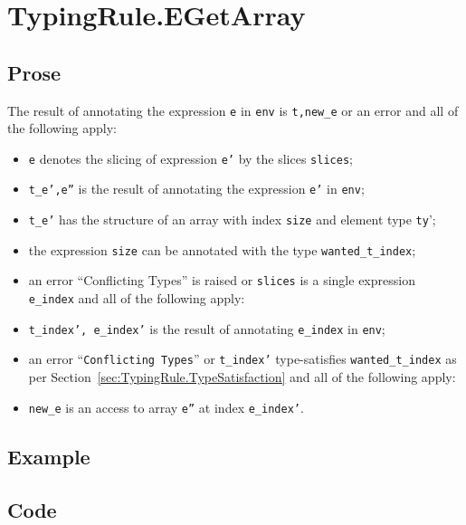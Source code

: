 \documentclass{book}
\begin{document}
\section{TypingRule.EGetArray \label{sec:TypingRule.EGetArray}}

  \subsection{Prose}
  The result of annotating the expression \texttt{e} in \texttt{env} is
\texttt{t,new\_e} or an error and all of the following apply:
  \begin{itemize}
  \item \texttt{e} denotes the slicing of expression \texttt{e'} by the slices \texttt{slices};
  \item \texttt{t\_e',e''} is the result of annotating the expression \texttt{e'} in \texttt{env};
  \item \texttt{t\_e'} has the structure of an array with index \texttt{size} and element type \texttt{ty}';
  \item the expression \texttt{size} can be annotated with the type \texttt{wanted\_t\_index};
  \item an error ``Conflicting Types'' is raised or \texttt{slices} is a single expression \texttt{e\_index} and all of the following apply:
  \item \texttt{t\_index', e\_index'} is the result of annotating \texttt{e\_index} in \texttt{env};
  \item an error ``\texttt{Conflicting Types}'' or \texttt{t\_index'} type-satisfies \texttt{wanted\_t\_index} as per Section~\ref{sec:TypingRule.TypeSatisfaction} and all of the following apply:
  \item \texttt{new\_e} is an access to array \texttt{e''} at index \texttt{e\_index'}.
  \end{itemize}

  \subsection{Example}

  \subsection{Code}
\end{document}
